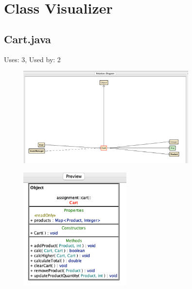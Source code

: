 \documentclass{article}
\begin{document}
\section{Class Visualizer}
\subsection{Cart.java}
Uses: 3, Used by: 2
\begin{figure}[H]
    \centering
    \includegraphics[width=0.8\textwidth]{img/cartDiagram.png}
\end{figure}
\begin{figure}[H]
    \centering
    \includegraphics[width=0.5\textwidth]{img/cartPreview.png}
\end{figure}
\end{document}
